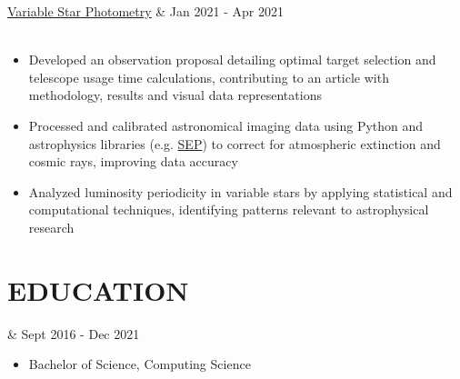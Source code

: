 \documentclass[letterpaper,11pt]{article} %
\newcommand{\resumeItem}[1]{\small{#1}\vspace{-5pt}}
\begin{document}
\begin{tabular*}
    \uline{\href{https://github.com/hykelvinlee42/RRLeo-Photometry}{Variable Star Photometry}} & {\color{TextBlack}\small Jan 2021 - Apr 2021}\vspace{1pt}\\
    \\
\end{tabular*}
\vspace{-5pt}
\begin{itemize}\vspace{-5pt}
    \item\resumeItem{Developed an observation proposal detailing optimal target selection and telescope usage time calculations, contributing to an article with methodology, results and visual data representations}
    \item\resumeItem{Processed and calibrated astronomical imaging data using Python and astrophysics libraries (e.g. \href{https://pypi.org/project/sep/}{SEP}) to correct for atmospheric extinction and cosmic rays, improving data accuracy}
    \item\resumeItem{Analyzed luminosity periodicity in variable stars by applying statistical and computational techniques, identifying patterns relevant to astrophysical research}
\end{itemize}

\section{EDUCATION}\label{education}

\begin{tabular*}
     & {\color{TextBlack}\small Sept 2016 - Dec 2021}\\
\end{tabular*}
\vspace{-20pt}
\begin{itemize}[leftmargin=0in, label={}]
    \item\resumeItem{Bachelor of Science, Computing Science}
\end{itemize}
\end{document}
